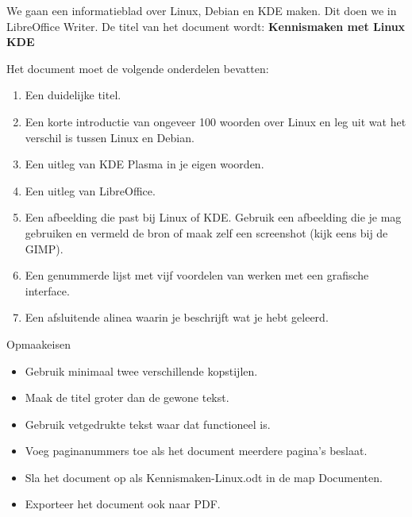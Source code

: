We gaan een informatieblad over Linux, Debian en KDE maken. Dit doen we in LibreOffice Writer. De titel van het document wordt: \textbf{Kennismaken met Linux KDE}

Het document moet de volgende onderdelen bevatten:
\begin{enumerate}
\item Een duidelijke titel.
\item Een korte introductie van ongeveer 100 woorden over Linux en leg uit wat het verschil is tussen Linux en Debian.
\item Een uitleg van KDE Plasma in je eigen woorden.
\item Een uitleg van LibreOffice.
\item Een afbeelding die past bij Linux of KDE. Gebruik een afbeelding die je mag gebruiken en vermeld de bron of maak zelf een screenshot (kijk eens bij de GIMP).
\item Een genummerde lijst met vijf voordelen van werken met een grafische interface.
\item Een afsluitende alinea waarin je beschrijft wat je hebt geleerd.
\end{enumerate}

Opmaakeisen
\begin{itemize}
\item Gebruik minimaal twee verschillende kopstijlen.
\item Maak de titel groter dan de gewone tekst.
\item Gebruik vetgedrukte tekst waar dat functioneel is.
\item Voeg paginanummers toe als het document meerdere pagina's beslaat.
\item Sla het document op als Kennismaken-Linux.odt in de map Documenten.
\item Exporteer het document ook naar PDF.
\end{itemize}

